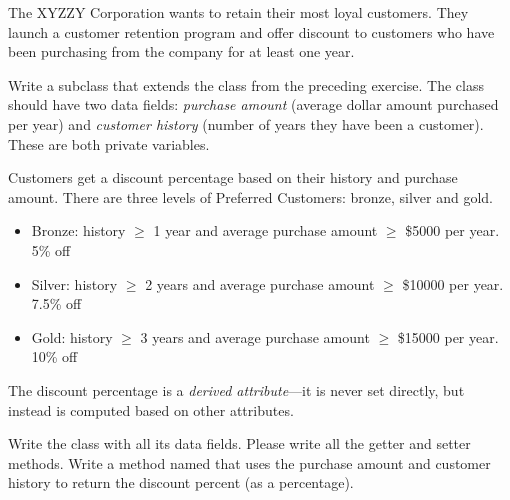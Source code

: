 \begin{exercise}
The XYZZY Corporation wants to retain their most loyal customers. They launch a customer retention program and offer discount to customers who have been purchasing from the company for at least one year.

Write a subclass  that extends the  class from the preceding exercise. The  class should have two data fields: {\em purchase amount} (average dollar amount purchased per year) and {\em customer history} (number of years they have been a customer). These are both private variables.

Customers get a discount percentage based on their history and purchase amount. There are three levels of Preferred Customers: bronze, silver and gold.

\begin{itemize}
\item Bronze: history $\geq$ 1 year and average purchase amount $\geq$ \$5000 per year.  5\% off
\item Silver:  history $\geq$ 2 years and average purchase amount $\geq$ \$10000 per year. 7.5\% off
\item Gold:  history $\geq$ 3 years and average purchase amount $\geq$ \$15000 per year. 10\% off
\end{itemize}

The discount percentage is a {\em derived attribute}---it is never set directly, but instead is computed based on other attributes.

Write the  class with all its data fields. Please write all the getter and setter methods.  Write a method named  that uses the purchase amount and customer history to return the discount percent (as a percentage).
\end{exercise}




